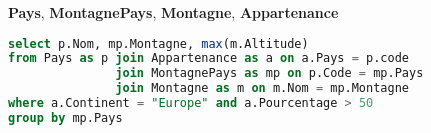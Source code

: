 {\bf Pays}, {\bf MontagnePays}, {\bf Montagne}, {\bf Appartenance}
\begin{Answer}
\begin{lstlisting}[language=SQL]
select p.Nom, mp.Montagne, max(m.Altitude)
from Pays as p join Appartenance as a on a.Pays = p.code
               join MontagnePays as mp on p.Code = mp.Pays
               join Montagne as m on m.Nom = mp.Montagne
where a.Continent = "Europe" and a.Pourcentage > 50
group by mp.Pays
\end{lstlisting}
\end{Answer}
